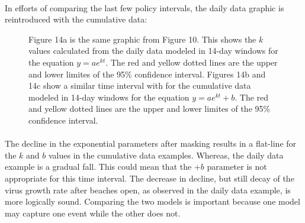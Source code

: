 \documentclass[12pt]{article}
\begin{document}
\paragraph{} In efforts of comparing the last few policy intervals, the daily data graphic is reintroduced with the cumulative data:
\begin{figure}[h]
  \centering
  \hfill
  \caption{Figure 14a is the same graphic from Figure 10. This shows the $k$ values calculated from the daily data modeled in 14-day windows for the equation $y=ae^{kt}$. The red and yellow dotted lines are the upper and lower limites of the 95\% confidence interval. Figures 14b and 14c show a similar time interval with for the cumulative data modeled in 14-day windows for the equation $y=ae^{kt}+b$. The red and yellow dotted lines are the upper and lower limites of the 95\% confidence interval.}
  \label{fig:14}
\end{figure}

\paragraph{} The decline in the exponential parameters after masking results in a flat-line for the $k$ and $b$ values in the cumulative data examples. Whereas, the daily data example is a gradual fall. This could mean that the $+b$ parameter is not appropriate for this time interval. The decrease in decline, but still decay of the virus growth rate after beaches open, as observed in the daily data example, is more logically sound. Comparing the two models is important because one model may capture one event while the other does not.
\end{document}

